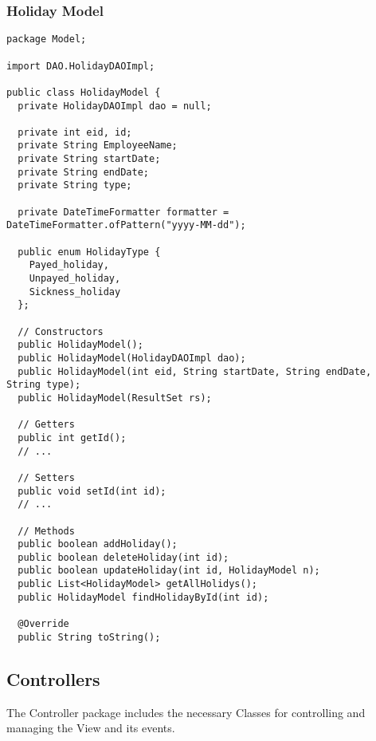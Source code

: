 \documentclass[12pt]{article}
\begin{document}
\subsubsection{Holiday Model}
\begin{lstlisting}
package Model;

import DAO.HolidayDAOImpl;

public class HolidayModel {
  private HolidayDAOImpl dao = null;

  private int eid, id;
  private String EmployeeName;
  private String startDate;
  private String endDate;
  private String type;

  private DateTimeFormatter formatter = DateTimeFormatter.ofPattern("yyyy-MM-dd");

  public enum HolidayType {
    Payed_holiday,
    Unpayed_holiday,
    Sickness_holiday
  };

  // Constructors
  public HolidayModel();
  public HolidayModel(HolidayDAOImpl dao);
  public HolidayModel(int eid, String startDate, String endDate, String type);
  public HolidayModel(ResultSet rs);

  // Getters
  public int getId();
  // ...

  // Setters
  public void setId(int id);
  // ...
  
  // Methods
  public boolean addHoliday();
  public boolean deleteHoliday(int id);
  public boolean updateHoliday(int id, HolidayModel n);
  public List<HolidayModel> getAllHolidys();
  public HolidayModel findHolidayById(int id);

  @Override
  public String toString();
\end{lstlisting}

\pagebreak

\subsection{Controllers}

The Controller package includes the necessary Classes for controlling
and managing the View and its events.
\end{document}
